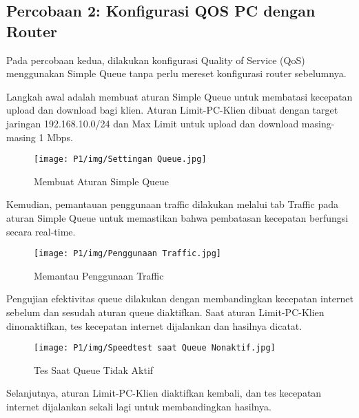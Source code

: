 \subsection*{Percobaan 2: Konfigurasi QOS PC dengan Router}

Pada percobaan kedua, dilakukan konfigurasi Quality of Service (QoS) menggunakan Simple Queue tanpa perlu mereset konfigurasi router sebelumnya.

Langkah awal adalah membuat aturan Simple Queue untuk membatasi kecepatan upload dan download bagi klien. Aturan Limit-PC-Klien dibuat dengan target jaringan 192.168.10.0/24 dan Max Limit untuk upload dan download masing-masing 1 Mbps.

\begin{figure}[H]
\centering
\begin{minipage}[b]{0.45\textwidth}
\texttt{[image: P1/img/Settingan Queue.jpg]}
\caption{Membuat Aturan Simple Queue}
\label{fig:simple_queue}
\end{minipage}
\end{figure}

Kemudian, pemantauan penggunaan traffic dilakukan melalui tab Traffic pada aturan Simple Queue untuk memastikan bahwa pembatasan kecepatan berfungsi secara real-time.

\begin{figure}[H]
\centering
\begin{minipage}[b]{0.45\textwidth}
\texttt{[image: P1/img/Penggunaan Traffic.jpg]}
\caption{Memantau Penggunaan Traffic}
\label{fig:monitor_traffic}
\end{minipage}
\end{figure}

Pengujian efektivitas queue dilakukan dengan membandingkan kecepatan internet sebelum dan sesudah aturan queue diaktifkan. Saat aturan Limit-PC-Klien dinonaktifkan, tes kecepatan internet dijalankan dan hasilnya dicatat.

\begin{figure}[H]
\centering
\begin{minipage}[b]{0.45\textwidth}
\texttt{[image: P1/img/Speedtest saat Queue Nonaktif.jpg]}
\caption{Tes Saat Queue Tidak Aktif}
\label{fig:queue_disabled}
\end{minipage}
\end{figure}

Selanjutnya, aturan Limit-PC-Klien diaktifkan kembali, dan tes kecepatan internet dijalankan sekali lagi untuk membandingkan hasilnya.


